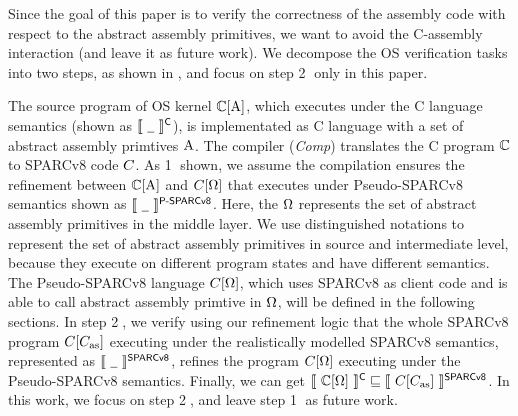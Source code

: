 
Since the goal of this paper is to verify the correctness of the 
assembly code with respect to the abstract assembly primitives,
we want to avoid the C-assembly interaction (and leave it as 
future work). We decompose the OS verification tasks into 
two steps, as shown in \Fig{\ref{fig:idea to establish contextual refinement}},
and focus on step {\color{blue} \textcircled{2}} only in this paper.


The source program of OS kernel
$\mathbb{C}[\text{A}]$, which executes
under the C language semantics (shown as
$\llbracket \ {\underline{\ \,}} \ \rrbracket^{\textsf{C}}$),
is implementated as C language
with a set of abstract assembly primtives $\text{A}$.
The compiler (\textit{Comp}) translates the
C program $\mathbb{C}$ to SPARCv8 code $C$.
As {\color{blue} \textcircled{1}} shown,
we assume the compilation ensures the
refinement between $\mathbb{C}[\text{A}]$ and
$C[\Omega]$ that
executes under Pseudo-SPARCv8 semantics shown as
$\llbracket \ {\underline{\ \,}} \ \rrbracket^{\textsf{P-SPARCv8}}$.
Here, the $\Omega$ represents the set of
abstract assembly primitives in the middle layer.
We use distinguished notations to represent
the set of abstract assembly primitives in source
and intermediate level, because they execute on
different program states and have different semantics.
The Pseudo-SPARCv8 language $C[\Omega]$,
which uses SPARCv8 as client code and is able to
call abstract assembly primtive in $\Omega$,
will be defined in the following sections.
In step {\color{blue} \textcircled{2}},
we verify using our refinement logic that 
the whole SPARCv8 program
$C[C_{\text{as}}]$ executing under the realistically
modelled SPARCv8 semantics, represented as
$\llbracket \ {\underline{\ \,}} \ \rrbracket^{\textsf{SPARCv8}}$, refines
the program $C[\Omega]$ executing
under the Pseudo-SPARCv8 semantics.
Finally, we can get
$\llbracket \ {\mathbb{C}[\Omega]} \ \rrbracket^{\textsf{C}}
\sqsubseteq
\llbracket \ {C[C_{\text{as}}]} \ \rrbracket^{\textsf{SPARCv8}}$.
In this work, we focus on
step {\color{blue} \textcircled{2}}, and
leave step {\color{blue} \textcircled{1}}
as future work.

